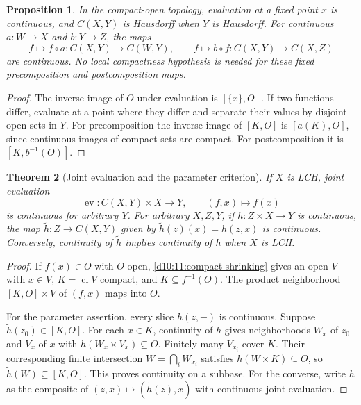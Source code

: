 \documentclass[11pt,oneside,openany]{book}
\newtheorem{theorem}{Theorem}[chapter]
\newtheorem{proposition}[theorem]{Proposition}
\theoremstyle{definition}
\theoremstyle{remark}
\DeclareMathOperator{\cl}{cl}
\begin{document}
\begin{proposition}\label{d10:13:functorial-maps}
In the compact-open topology, evaluation at a fixed point $x$ is continuous, and $C(X,Y)$ is Hausdorff when $Y$ is Hausdorff. For continuous $a:W\to X$ and $b:Y\to Z$, the maps
\[
 f\longmapsto f\circ a:C(X,Y)\to C(W,Y),\qquad
 f\longmapsto b\circ f:C(X,Y)\to C(X,Z)
\]
are continuous. No local compactness hypothesis is needed for these fixed precomposition and postcomposition maps.
\end{proposition}
\begin{proof}
The inverse image of $O$ under evaluation is $[\{x\},O]$. If two functions differ, evaluate at a point where they differ and separate their values by disjoint open sets in $Y$. For precomposition the inverse image of $[K,O]$ is $[a(K),O]$, since continuous images of compact sets are compact. For postcomposition it is $[K,b^{-1}(O)]$.
\end{proof}

\begin{theorem}[Joint evaluation and the parameter criterion]\label{d10:13:evaluation-exponential}
If $X$ is LCH, joint evaluation
\[
 \operatorname{ev}:C(X,Y)\times X\to Y,\qquad(f,x)\mapsto f(x)
\]
is continuous for arbitrary $Y$. For arbitrary $X,Z,Y$, if $h:Z\times X\to Y$ is continuous, the map $\widetilde h:Z\to C(X,Y)$ given by $\widetilde h(z)(x)=h(z,x)$ is continuous. Conversely, continuity of $\widetilde h$ implies continuity of $h$ when $X$ is LCH.
\end{theorem}
\begin{proof}
If $f(x)\in O$ with $O$ open, \cref{d10:11:compact-shrinking} gives an open $V$ with $x\in V$, $K=\cl V$ compact, and $K\subseteq f^{-1}(O)$. The product neighborhood $[K,O]\times V$ of $(f,x)$ maps into $O$.

For the parameter assertion, every slice $h(z,-)$ is continuous. Suppose $\widetilde h(z_0)\in[K,O]$. For each $x\in K$, continuity of $h$ gives neighborhoods $W_x$ of $z_0$ and $V_x$ of $x$ with $h(W_x\times V_x)\subseteq O$. Finitely many $V_{x_i}$ cover $K$. Their corresponding finite intersection $W=\bigcap_i W_{x_i}$ satisfies $h(W\times K)\subseteq O$, so $\widetilde h(W)\subseteq[K,O]$. This proves continuity on a subbase. For the converse, write $h$ as the composite of $(z,x)\mapsto(\widetilde h(z),x)$ with continuous joint evaluation.
\end{proof}
\end{document}
